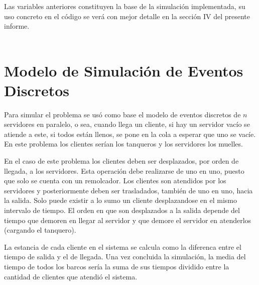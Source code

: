 \documentclass[twoside]{article}
\begin{document}
Las variables anteriores constituyen la base de la simulaci\'on implementada, su uso concreto en el c\'odigo se ver\'a con mejor detalle en la secci\'on IV del presente informe.\\\\


\section{Modelo de Simulaci\'on de Eventos Discretos}
Para simular el problema se us\'o como base el modelo de eventos discretos de $n$ servidores en paralelo, o sea, cuando llega un cliente, si hay un servidor vac\'io se atiende a este, si todos est\'an llenos, se pone en la cola a esperar que uno se vac\'ie. En este problema los clientes ser\'ian los tanqueros y los servidores los muelles.

En el caso de este problema los clientes deben ser desplazados, por orden de llegada, a los servidores. Esta operaci\'on debe realizarse de uno en uno, puesto que solo se cuenta con un remolcador. Los clientes son atendidos por los servidores y posteriormente deben ser trasladados, tambi\'en de uno en uno, hacia la salida. Solo puede existir a lo sumo un cliente desplazandose en el mismo intervalo de tiempo. El orden en que son desplazados a la salida depende del tiempo que demoren en llegar al servidor y que demore el servidor en atenderlos (cargando el tanquero).  

La estancia de cada cliente en el sistema se calcula como la diferenca entre el tiempo de salida y el de llegada. Una vez concluida la simulaci\'on, la media del tiempo de todos los barcos ser\'ia la suma de sus tiempos dividido entre la cantidad de clientes que atendi\'o el sistema.
\end{document}

